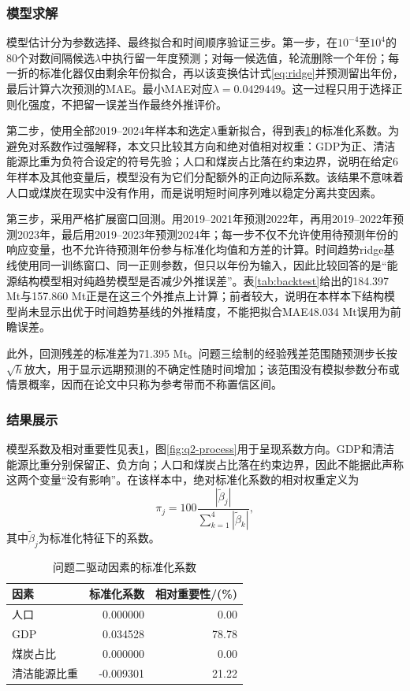 \documentclass[12pt,a4paper]{ctexart}
\theoremstyle{definition}
\theoremstyle{plain}
\theoremstyle{remark}
\begin{document}
\subsubsection{模型求解}
模型估计分为参数选择、最终拟合和时间顺序验证三步。第一步，在$10^{-4}$至$10^{4}$的80个对数间隔候选$\lambda$中执行留一年度预测；对每一候选值，轮流删除一个年份；每一折的标准化器仅由剩余年份拟合，再以该变换估计式\eqref{eq:ridge}并预测留出年份，最后计算六次预测的MAE。最小MAE对应$\lambda=0.0429449$。这一过程只用于选择正则化强度，不把留一误差当作最终外推评价。

第二步，使用全部2019--2024年样本和选定$\lambda$重新拟合，得到表\ref{tab:coef}的标准化系数。为避免对系数作过强解释，本文只比较其方向和绝对值相对权重：GDP为正、清洁能源比重为负符合设定的符号先验；人口和煤炭占比落在约束边界，说明在给定6年样本及其他变量后，模型没有为它们分配额外的正向边际系数。该结果不意味着人口或煤炭在现实中没有作用，而是说明短时间序列难以稳定分离共变因素。

第三步，采用严格扩展窗口回测。用2019--2021年预测2022年，再用2019--2022年预测2023年，最后用2019--2023年预测2024年；每一步不仅不允许使用待预测年份的响应变量，也不允许待预测年份参与标准化均值和方差的计算。时间趋势ridge基线使用同一训练窗口、同一正则参数，但只以年份为输入，因此比较回答的是“能源结构模型相对纯趋势模型是否减少外推误差”。表\ref{tab:backtest}给出的184.397 Mt与157.860 Mt正是在这三个外推点上计算；前者较大，说明在本样本下结构模型尚未显示出优于时间趋势基线的外推精度，不能把拟合MAE48.034 Mt误用为前瞻误差。

此外，回测残差的标准差为71.395 Mt。问题三绘制的经验残差范围随预测步长按$\sqrt{h}$放大，用于显示远期预测的不确定性随时间增加；该范围没有模拟参数分布或情景概率，因而在论文中只称为参考带而不称置信区间。
\subsubsection{结果展示}
模型系数及相对重要性见表\ref{tab:coef}，图\ref{fig:q2-process}用于呈现系数方向。GDP和清洁能源比重分别保留正、负方向；人口和煤炭占比落在约束边界，因此不能据此声称这两个变量“没有影响”。在该样本中，绝对标准化系数的相对权重定义为
\begin{equation}
\pi_j=100\frac{|\widetilde\beta_j|}{\sum_{k=1}^{4}|\widetilde\beta_k|},
\label{eq:importance}
\end{equation}
其中$\widetilde\beta_j$为标准化特征下的系数。

\begin{table}[H]
\centering
\caption{问题二驱动因素的标准化系数}
\label{tab:coef}
\begin{tabular}{lrr}
\toprule
因素 & 标准化系数 & 相对重要性/(\%)\\
\midrule
人口 & 0.000000 & 0.00\\
GDP & 0.034528 & 78.78\\
煤炭占比 & 0.000000 & 0.00\\
清洁能源比重 & -0.009301 & 21.22\\
\bottomrule
\end{tabular}
\end{table}
\end{document}
